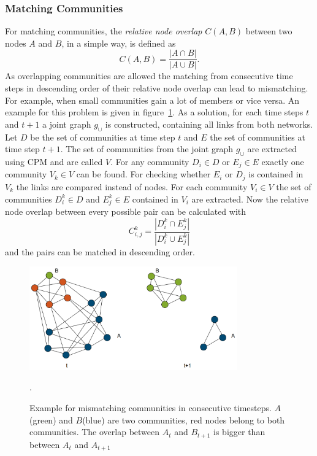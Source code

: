 \documentclass[runningheads,a4paper]{llncs}
\begin{document}
\subsubsection{Matching Communities}
\label{evolution-algo-matching}
For matching communities, the \emph{relative node overlap} $C(A,B)$ between two nodes $A$ and $B$, in a simple way, is defined as
$$C(A,B) = \frac{ \left| A \cap B\right| }{\left| A \cup B\right|}.$$
As overlapping communities are allowed the matching from consecutive time steps in descending order of their relative node overlap can lead to mismatching.
For example, when small communities gain a lot of members or vice versa. An example for this problem is given in figure~\ref{fig:mismatch}.
As a solution, for each time steps $t$ and $t+1$ a joint graph $g_{\cup}$ is constructed, containing all links from both networks.
Let $D$ be the set of communities at time step $t$ and $E$ the set of communities at time step $t+1$. The set of communities from the joint graph $g_{\cup}$ are extracted using CPM and are called $V$.
For any community $D_i \in D$ or $E_j \in E$ exactly one community $V_k \in V$ can be found.
For checking whether $E_i$ or $D_j$ is contained in $V_k$ the links are compared instead of nodes.
For each community $V_i \in V$ the set of communities $D_i^k \in D$ and $E_j^k \in E$ contained in $V_i$ are extracted.
Now the relative node overlap between every possible pair can be calculated with
$$C^k_{i,j} = \frac{\left| D_i^k \cap E_j^k\right|}{\left| D_i^k\cup E_j^k \right| }$$
and the pairs can be matched in descending order.

\begin{figure}
\begin{center}
	\includegraphics[width=0.8\textwidth]{img/mismatch.png}
		\caption{Example for mismatching communities in consecutive timesteps. $A$(green) and $B$(blue) are two communities, red nodes belong to both communities. The overlap between $A_t$ and $B_{t+1}$ is bigger than between $A_t$ and $A_{t+1}$}.
		\label{fig:mismatch}
\end{center}
\end{figure}
\end{document}
